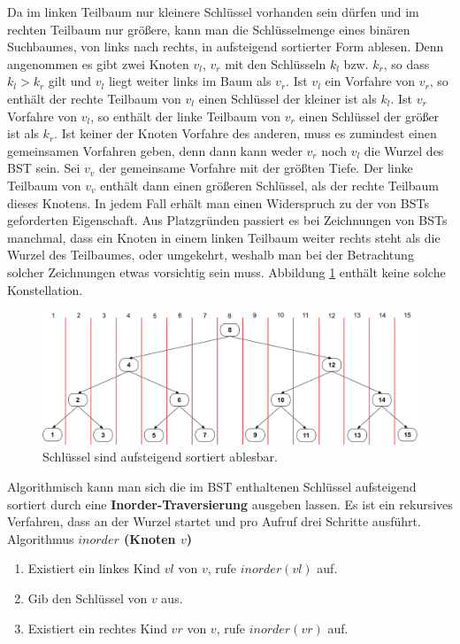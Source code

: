 \documentclass[a4paper,12pt]{article}
\begin{document}
\noindent Da im linken Teilbaum nur kleinere Schlüssel vorhanden sein dürfen und im rechten Teilbaum nur größere, kann man die Schlüsselmenge eines binären Suchbaumes, von links nach rechts, in aufsteigend sortierter Form ablesen. Denn angenommen es gibt zwei Knoten $v_l$, $v_r$ mit den Schlüsseln $k_l$ bzw. $k_r$, so dass $k_l > k_r$ gilt und $v_l$ liegt weiter links im Baum als $v_r$. Ist $v_l$ ein Vorfahre von $v_r$, so enthält der rechte Teilbaum von $v_l$ einen Schlüssel der kleiner ist als $k_l$. Ist $v_r$ Vorfahre von $v_l$, so enthält der linke Teilbaum von $v_r$ einen Schlüssel der größer ist als $k_r$. Ist keiner der Knoten Vorfahre des anderen, muss es zumindest einen gemeinsamen Vorfahren geben, denn dann kann weder $v_r$ noch $v_l$ die Wurzel des BST sein. Sei $v_v$ der gemeinsame Vorfahre mit der größten Tiefe. Der linke Teilbaum von $v_v$ enthält dann einen größeren Schlüssel, als der rechte Teilbaum dieses Knotens. In jedem Fall erhält man einen Widerspruch zu der von BSTs geforderten Eigenschaft. Aus Platzgründen passiert es bei Zeichnungen von BSTs manchmal, dass ein Knoten in einem linken Teilbaum weiter rechts steht als die Wurzel des Teilbaumes, oder umgekehrt, weshalb man bei der Betrachtung solcher Zeichnungen etwas vorsichtig sein muss. Abbildung \ref{fig:linksRechts} enthält keine solche Konstellation.  

\begin{figure}[h]
	\centering
	\includegraphics[width= 1\textwidth]{"Medien/Einleitung/linksRechts"}
	\caption{Schlüssel sind aufsteigend sortiert ablesbar. }
	\label{fig:linksRechts}
\end{figure}
\noindent Algorithmisch kann man sich die im BST enthaltenen Schlüssel aufsteigend sortiert durch eine \textbf{Inorder-Traversierung} ausgeben lassen. Es ist ein rekursives Verfahren, dass an der Wurzel startet und pro Aufruf drei Schritte ausführt.\\

Algorithmus \textbf{$\mathit{inorder}$ (Knoten $v$)}
\begin{enumerate}
	\item Existiert ein linkes Kind $\mathit{vl}$ von $v$, rufe $\mathit{inorder(vl)}$ auf. 
	\item Gib den Schlüssel von $v$ aus. 
	\item Existiert ein rechtes Kind $\mathit{vr}$ von $v$, rufe $\mathit{inorder(vr)}$ auf. 
\end{enumerate}
\end{document}
